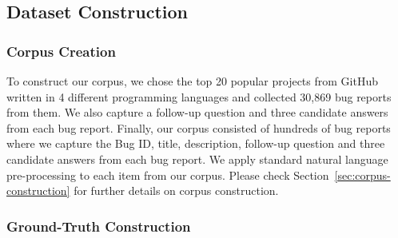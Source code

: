 

\subsection{Dataset Construction}\label{sec:dataset-cons}
\subsubsection{Corpus Creation}

To construct our corpus, we chose the top 20 popular projects from GitHub written in 4 different programming languages and collected 30,869 bug reports from them. We also capture a follow-up question and three candidate answers from each bug report. Finally, our corpus consisted of hundreds of bug reports where we capture the Bug ID, title, description, follow-up question and three candidate answers from each bug report. We apply standard natural language pre-processing to each item from our corpus. Please check Section~\ref{sec:corpus-construction} for further details on corpus construction.\par

\subsubsection{Ground-Truth Construction}
\label{sec:groundtruth}

